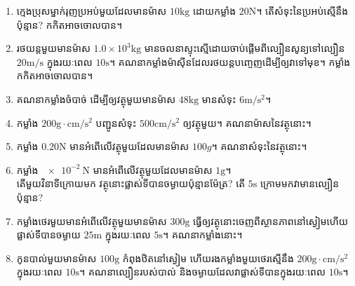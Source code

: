 \begin{exercise}
	\begin{enumerate}
		\item ក្មេងប្រុសម្នាក់រុញប្រអប់មួយដែលមានម៉ាស $10\si{\kilogram}$ ដោយកម្លាំង $20\si{\newton}$។ តើសំទុះនៃប្រអប់ស្មើនឹងប៉ុន្មាន? កកិតអាចចោលបាន។
		\item រថយន្តមួយមានម៉ាស $1.0\times10^{3}\si{\kilogram}$ មានចលនាស្ទុះស្មើដោយចាប់ផ្តើមពីល្បឿនសូន្យទៅល្បឿន $20\si{\metre/\second}$ ក្នុងរយៈពេល $10\si{\second}$។ គណនាកម្លាំងម៉ាស៊ីនដែលរថយន្តបញ្ចេញដើម្បីឲ្យវាទៅមុខ។ កម្លាំងកកិតអាចចោលបាន។ 
		\item គណនាកម្លាំងចំបាច់ ដើម្បីឲ្យវត្ថុមួយមានម៉ាស $48\si{\kilogram}$ មានសំទុះ $6\si{\metre/\second^{2}}$។
		\item កម្លាំង $200\si{\gram\cdot\centi\metre/\second^{2}}$ បញ្ជូនសំទុះ $500\si{\centi\metre/\second^{2}}$ ឲ្យវត្ថុមួយ។ គណនាម៉ាសនៃវត្ថុនោះ។
		\item កម្លាំង $0.20\si{\newton}$ មានអំពើលើវត្ថុមួយដែលមានម៉ាស $100g$។ គណនាសំទុះនៃវត្ថុនោះ។
		\item កម្លាំង $\SI{e-2}{\newton}$ មានអំពើលើវត្ថុមួយដែលមានម៉ាស $1\si{\gram}$។\\ តើមួយវិនាទីក្រោយមក វត្ថុនោះផ្លាស់ទីបានចម្ងាយប៉ុន្មានម៉ែត្រ? តើ $5\si{\second}$ ក្រោមមកវាមានល្បឿនប៉ុន្មាន?
		\item កម្លាំងថេរមួយមានអំពើលើវត្ថុមួយមានម៉ាស $300\si{\gram}$ ធ្វើឲ្យវត្ថុនោះចេញពីស្ថានភាពនៅស្ងៀមហើយផ្លាស់ទីបានចម្ងាយ $25\si{\meter}$ ក្នុងរយៈពេល $5\si{\second}$។ គណនាកម្លាំងនោះ។
		\item កូនបាល់មួយមានម៉ាស $100\si{\gram}$ កំពុងឋិតនៅស្ងៀម ហើយរងកម្លាំងមួយថេរស្មើនឹង $200\si{\gram\cdot\centi\metre/\second^{2}}$ ក្នុងរយៈពេល $10\si{\second}$។ គណនាល្បឿនរបស់បាល់ និងចម្ងាយដែលវាផ្លាស់ទីបានក្នុងរយៈពេល $10\si{\second}$។
	\end{enumerate}
\end{exercise}
